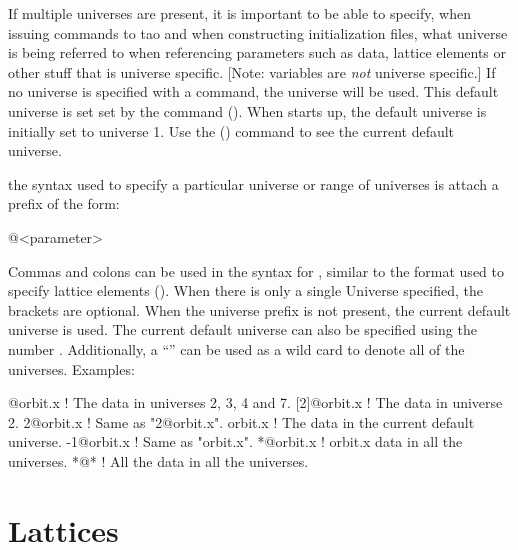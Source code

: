 If multiple universes are present, it is important to be able to
specify, when issuing commands to tao and when constructing \tao
initialization files, what universe is being referred to when
referencing parameters such as data, lattice elements or other stuff
that is universe specific. [Note: \tao variables are {\em not}
universe specific.] If no universe is specified with a command, the
 universe will be used. This default universe is set set
by the  command (). When \tao
starts up, the default universe is initially set to universe 1. Use
the  () command to see the current
default universe.

the syntax used to specify a particular universe or range of universes
is attach a prefix of the form:
\begin{example}
  @<parameter>
\end{example}
Commas and colons can be used in the syntax for ,
similar to the  format used to specify lattice
elements ().  When there is only a single
Universe specified, the brackets \vn{[...]} are optional. When the
universe prefix is not present, the current default
universe is used. The current default universe
can also be specified using the number . Additionally, a
``\vn{*}'' can be used as a wild card to denote all of the
universes. Examples:
\begin{example}
  [2:4,7]@orbit.x ! The  data in universes 2, 3, 4 and 7.
  [2]@orbit.x     ! The  data in universe 2. 
  2@orbit.x       ! Same as "2@orbit.x".
  orbit.x         ! The  data in the current default universe.
  -1@orbit.x      ! Same as "orbit.x".
  *@orbit.x       ! orbit.x data in all the universes.
  *@*             ! All the data in all the universes. 
\end{example}

\section{Lattices}
\label{s:lattice}

